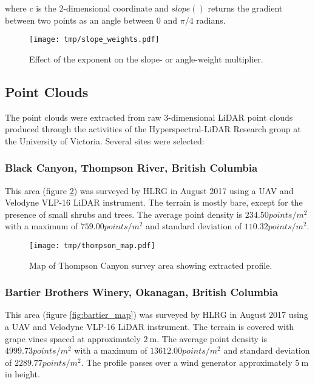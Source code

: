 \documentclass[doc]{apa6}
\begin{document}
where $c$ is the 2-dimensional coordinate and $slope()$ returns the gradient between two points as an angle between $0$ and $\pi/4$ radians.


\begin{figure} %
\texttt{[image: tmp/slope\_weights.pdf]} 
\caption{Effect of the exponent on the slope- or angle-weight multiplier.}
\label{fig:slope_weight}
\end{figure}

\subsection{Point Clouds}

The point clouds were extracted from raw 3-dimensional LiDAR point clouds produced through the activities of the Hyperspectral-LiDAR Research group at the University of Victoria. Several sites were selected:

\subsubsection{Black Canyon, Thompson River, British Columbia}

This area (figure \ref{fig:thompson_map}) was surveyed by HLRG in August 2017 using a UAV and Velodyne VLP-16 LiDAR instrument. The terrain is mostly bare, except for the presence of small shrubs and trees. The average point density is $234.50points/m^2$ with a maximum of $759.00points/m^2$ and standard deviation of $110.32points/m^2$.

\begin{figure} %
\texttt{[image: tmp/thompson\_map.pdf]} 
\caption{Map of Thompson Canyon survey area showing extracted profile.}
\label{fig:thompson_map}
\end{figure}


\subsubsection{Bartier Brothers Winery, Okanagan, British Columbia}

This area (figure \ref{fig:bartier_map}) was surveyed by HLRG in August 2017 using a UAV and Velodyne VLP-16 LiDAR instrument. The terrain is covered with grape vines spaced at approximately $\SI{2}\m$. The average point density is $4999.73points/m^2$ with a maximum of $13612.00points/m^2$ and standard deviation of $2289.77points/m^2$. The profile passes over a wind generator approximately $\SI{5}\m$ in height.
\end{document}
